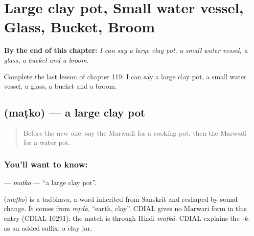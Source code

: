 
\chapter{Large clay pot, Small water vessel, Glass, Bucket, Broom}
\label{ch:mw-large-clay-pot-small-water-vessel-glass-bucket-broom}

\begin{chapteropening}
\textbf{By the end of this chapter:} \emph{I can say a large clay pot, a small water vessel, a glass, a bucket and a broom.}

Complete the last lesson of chapter 119: I can say a large clay pot, a small water vessel, a glass, a bucket and a broom.
\end{chapteropening}

\section[\texorpdfstring{\mw{मटको} (maṭko)}{मटको (maṭko)}]{ (maṭko) — a large clay pot}

\label{lesson:MW-C119-matko}



\begin{quote}
Before the new one: say the Marwadi for a cooking pot, then the Marwadi for a water pot.
\end{quote}

\subsection*{You'll want to know: }
\textbf{} — \emph{maṭko} — \textquotedblleft{}a large clay pot\textquotedblright{}.

\begin{cousinweb}
\textbf{} (\emph{maṭko}) is a tadbhava, a word inherited from Sanskrit and reshaped by sound change. It comes from \emph{mṛdā}, \textquotedblleft{}earth, clay\textquotedblright{}. CDIAL gives no Marwari form in this entry (CDIAL 10291); the match is through Hindi \emph{maṭkā}. CDIAL explains the \emph{-k-} as an added suffix: a clay jar.
\end{cousinweb}

